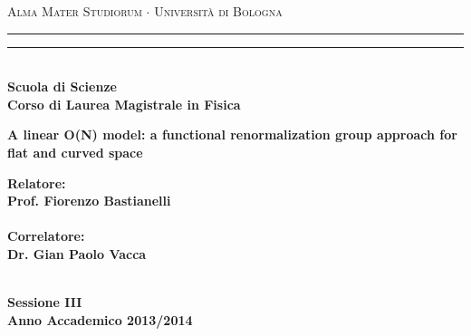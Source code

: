 \documentclass[11pt,a4paper,twoside]{book}
\theoremstyle{plain}
\theoremstyle{definition}
\theoremstyle{remark}
\begin{document}
\begin{titlepage}
%
%
%
%
\begin{center}
{{\Large{\textsc{Alma Mater Studiorum $\cdot$ Universit\`a di Bologna}}}} 
\rule[0.1cm]{15.8cm}{0.1mm}
\rule[0.5cm]{15.8cm}{0.6mm}
\\\vspace{3mm}
%
%
{\small{\bf Scuola di Scienze \\ Corso di Laurea Magistrale in Fisica}}

\end{center}

\vspace{23mm}

\begin{center}{
%
%
{\LARGE{\bf A linear O(N) model: a functional renormalization group approach for flat and curved space}}\\
}\end{center}

\vspace{50mm} \par \noindent

\begin{minipage}[t]{0.47\textwidth}
%
%
{\large{\bf Relatore: \vspace{2mm}\\{
Prof. Fiorenzo Bastianelli}\\\\
%
%
%
{
\bf Correlatore: 
\vspace{2mm}\\
Dr. Gian Paolo Vacca\\\\}}}
\end{minipage}
%
\hfill
%
\begin{minipage}[t]{0.47\textwidth}
\end{minipage}

\vspace{17mm}

\begin{center}
%
%
{\large{\bf Sessione  {III}
\vspace{2mm}\\
%
%
Anno Accademico {2013/2014}}}
\end{center}

\end{titlepage}
\end{document}
